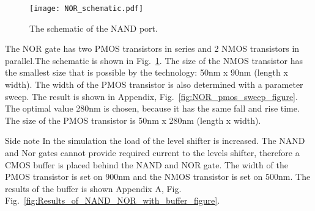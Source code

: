 \begin{figure}[htp]
\texttt{[image: NOR\_schematic.pdf]}
\caption{The schematic of the NAND port.}
\label{fig:NOR_schematic_figure}
\end{figure}

The NOR gate has two PMOS transistors in series and 2 NMOS transistors in parallel.The schematic is shown in Fig.~\ref{fig:NOR_schematic_figure}. The size of the NMOS transistor has the smallest size that is possible by the technology: 50nm x 90nm (length x width). The width of the PMOS transistor is also determined with a parameter sweep. The result is shown in Appendix, Fig.~\ref{fig:NOR_pmos_sweep_figure}. The optimal value 280nm is chosen, because it has the same fall and rise time. The size of the PMOS transistor is 50nm x 280nm (length x width).

Side note
In the simulation the load of the level shifter is increased. The NAND and Nor gates cannot provide required current to the levels shifter, therefore a CMOS buffer is placed behind the NAND and NOR gate. The width of the PMOS transistor is set on 900nm and the NMOS transistor is set on 500nm. The results of the buffer is shown Appendix A, Fig. Fig.~\ref{fig:Results_of_NAND_NOR_with_buffer_figure}.

